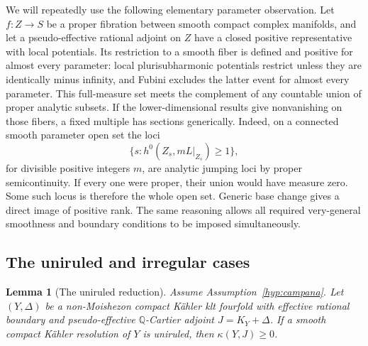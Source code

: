 \documentclass[11pt,letterpaper]{article}
\newtheorem{lemma}[theorem]{Lemma}
\theoremstyle{definition}
\theoremstyle{remark}
\begin{document}
We will repeatedly use the following elementary parameter observation.
Let \(f:Z\to S\) be a proper fibration between smooth compact complex
manifolds, and let a pseudo-effective rational adjoint on \(Z\) have a
closed positive representative with local potentials. Its restriction
to a smooth fiber is defined and positive for almost every parameter:
local plurisubharmonic potentials restrict unless they are identically
minus infinity, and Fubini excludes the latter event for almost every
parameter. This full-measure set meets the complement of any countable
union of proper analytic subsets. If the lower-dimensional results give
nonvanishing on those fibers, a fixed multiple has sections generically.
Indeed, on a connected smooth parameter open set the loci
\[
 \{s:h^0(Z_s,mL|_{Z_s})\geq1\},
\]
for divisible positive integers \(m\), are analytic jumping loci by
proper semicontinuity. If every one were proper, their union would have
measure zero. Some such locus is therefore the whole open set. Generic
base change gives a direct image of positive rank. The same reasoning
allows all required very-general smoothness and boundary conditions to
be imposed simultaneously.

\subsection{The uniruled and irregular cases}

\begin{lemma}[The uniruled reduction]\label{red:uniruled}
Assume Assumption~\ref{hyp:campana}.
Let \((Y,\Delta)\) be a non-Moishezon compact Kähler klt fourfold with
effective rational boundary and pseudo-effective \(\mathbb{Q}\)-Cartier adjoint
\(J=K_Y+\Delta\). If a smooth compact Kähler resolution of \(Y\) is
uniruled, then \(\kappa(Y,J)\geq0\).
\end{lemma}
\end{document}
